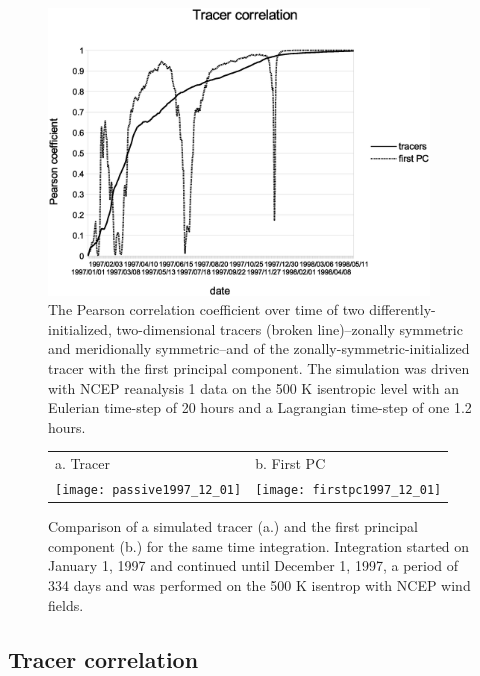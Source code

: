 \begin{figure}
\begin{center}
\includegraphics[width=0.9\textwidth]{tracer_correlation}
\caption{The Pearson correlation coefficient over time of two differently-initialized,
	two-dimensional tracers
(broken line)--zonally symmetric and meridionally symmetric--and of
the zonally-symmetric-initialized tracer with the first principal component.
The simulation was driven with NCEP reanalysis 1 data on the 500 K isentropic
level with an Eulerian time-step of 20 hours and a Lagrangian time-step
of one 1.2 hours.}\label{tcorr}
\end{center}
\end{figure}

\begin{figure}
\begin{tabular}{ll}
a. Tracer & b. First PC\\
\texttt{[image: passive1997\_12\_01]} &
\texttt{[image: firstpc1997\_12\_01]}
\end{tabular}
\caption{Comparison of a simulated tracer (a.) and the first principal
component (b.) for the same time integration.
Integration started on January 1, 1997 and continued until December 1, 1997, a period of 334 days and was performed on the 500 K isentrop with NCEP wind fields.}\label{pc1}
\end{figure}

\subsection{Tracer correlation}

